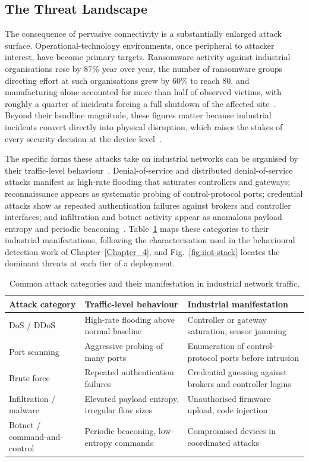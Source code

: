 \subsection{The Threat Landscape}
\label{subsec:bg-threats}

The consequence of pervasive connectivity is a substantially enlarged attack
surface. Operational-technology environments, once peripheral to attacker
interest, have become primary targets. Ransomware activity against industrial
organisations rose by 87\% year over year, the number of ransomware groups
directing effort at such organisations grew by 60\% to reach 80, and
manufacturing alone accounted for more than half of observed victims, with
roughly a quarter of incidents forcing a full shutdown of the affected
site~\cite{dragos2025}. Beyond their headline magnitude, these figures matter
because industrial incidents convert directly into physical disruption, which
raises the stakes of every security decision at the device
level~\cite{yu2023survey}.

The specific forms these attacks take on industrial networks can be organised by
their traffic-level behaviour~\cite{aslam2024scrutinizing, sasi2024comprehensive}.
Denial-of-service and distributed denial-of-service attacks manifest as
high-rate flooding that saturates controllers and gateways; reconnaissance
appears as systematic probing of control-protocol ports; credential attacks
show as repeated authentication failures against brokers and controller
interfaces; and infiltration and botnet activity appear as anomalous payload
entropy and periodic beaconing~\cite{gelgi2024systematic}.
Table~\ref{tab:attack-map} maps these categories to their industrial
manifestations, following the characterisation used in the behavioural detection
work of Chapter~\ref{Chapter_4}, and Fig.~\ref{fig:iiot-stack} locates the
dominant threats at each tier of a deployment.

\begin{table}[!htbp]
\centering
\caption{Common attack categories and their manifestation in industrial network
traffic.}
\label{tab:attack-map}
\small
\begin{tabular}{p{3.0cm} p{4.5cm} p{5.0cm}}
\toprule
\textbf{Attack category} & \textbf{Traffic-level behaviour} & \textbf{Industrial manifestation} \\
\midrule
DoS / DDoS & High-rate flooding above normal baseline & Controller or gateway saturation, sensor jamming \\
Port scanning & Aggressive probing of many ports & Enumeration of control-protocol ports before intrusion \\
Brute force & Repeated authentication failures & Credential guessing against brokers and controller logins \\
Infiltration / malware & Elevated payload entropy, irregular flow sizes & Unauthorised firmware upload, code injection \\
Botnet / command-and-control & Periodic beaconing, low-entropy commands & Compromised devices in coordinated attacks \\
\bottomrule
\end{tabular}
\end{table}

